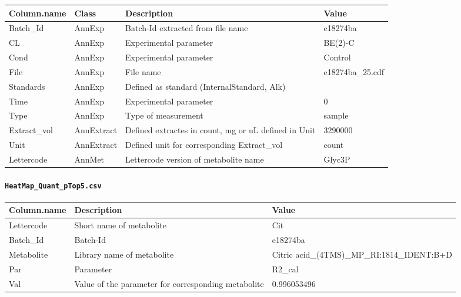 \documentclass[]{book}
\let\oldparagraph\paragraph
\renewcommand{\paragraph}[1]{\oldparagraph{#1}\mbox{}}
\begin{document}
\begin{tabu} to 
\toprule
Column.name & Class & Description & Value\\
\midrule
{}  Batch\_Id & AnnExp & Batch-Id extracted from file name & e18274ba\\
CL & AnnExp & Experimental parameter & BE(2)-C\\
  Cond & AnnExp & Experimental parameter & Control\\
File & AnnExp & File name & e18274ba\_25.cdf\\
  Standards & AnnExp & Defined as standard (InternalStandard, Alk) & \\
\addlinespace
Time & AnnExp & Experimental parameter & 0\\
  Type & AnnExp & Type of measurement & sample\\
Extract\_vol & AnnExtract & Defined extractes in count, mg or uL defined in Unit & 3290000\\
  Unit & AnnExtract & Defined unit for corresponding Extract\_vol & count\\
Lettercode & AnnMet & Lettercode version of metabolite name & Glyc3P\\
\bottomrule
\end{tabu}

\hypertarget{heatmap_quant_ptop5.csv}{%
\paragraph{\texorpdfstring{\texttt{HeatMap\_Quant\_pTop5.csv}}{HeatMap\_Quant\_pTop5.csv}}\label{heatmap_quant_ptop5.csv}}

\begin{tabu} to 
\toprule
Column.name & Description & Value\\
\midrule
{}  Lettercode & Short name of metabolite & Cit\\
Batch\_Id & Batch-Id & e18274ba\\
  Metabolite & Library name of metabolite & Citric acid\_(4TMS)\_MP\_RI:1814\_IDENT:B+D\\
Par & Parameter & R2\_cal\\
  Val & Value of the parameter for corresponding metabolite & 0.996053496\\
\bottomrule
\end{tabu}
\end{document}
